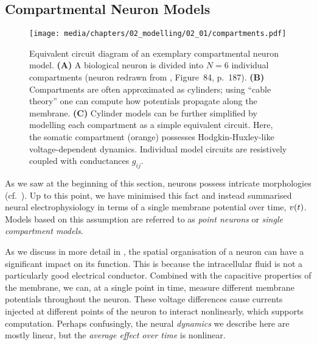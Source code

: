 
\subsection{Compartmental Neuron Models}
\label{sec:comp}

\begin{figure}
	\centering
	\texttt{[image: media/chapters/02\_modelling/02\_01/compartments.pdf]}
	{\label{fig:compartments_physical}}%
	{\label{fig:compartments_volumes}}%
	{\label{fig:compartments_circuit}}%
	\caption[Equivalent circuit of an exemplary compartmental neuron model]{Equivalent circuit diagram of an exemplary compartmental neuron model. \textbf{(A)} A biological neuron is divided into $N = 6$ individual compartments (neuron redrawn from \cite{howell1916textbook}, Figure~84, p.~187).
	\textbf{(B)} Compartments are often approximated as cylinders; using \enquote{cable theory} one can compute how potentials propagate along the membrane.
	\textbf{(C)} Cylinder models can be further simplified by modelling each compartment as a simple equivalent circuit. Here, the somatic compartment (orange) possesses Hodgkin-Huxley-like voltage-dependent dynamics. Individual model circuits are resistively coupled with conductances $g_{ij}$.
	}
	\label{fig:compartments}
\end{figure}

As we saw at the beginning of this section, neurons possess intricate morphologies (cf.~).
Up to this point, we have minimised this fact and instead summarised neural electrophysiology in terms of a single membrane potential over time, ${v}(t)$.
Models based on this assumption are referred to as \emph{point neurons} or \emph{single compartment models}.

As we discuss in more detail in , the spatial organisation of a neuron can have a significant impact on its function.
This is because the intracellular fluid is not a particularly good electrical conductor.
Combined with the capacitive properties of the membrane, we can, at a single point in time, measure different membrane potentials throughout the neuron.
These voltage differences cause currents injected at different points of the neuron to interact nonlinearly, which supports computation.
Perhaps confusingly, the neural \emph{dynamics} we describe here are mostly linear, but the \emph{average effect over time} is nonlinear.

